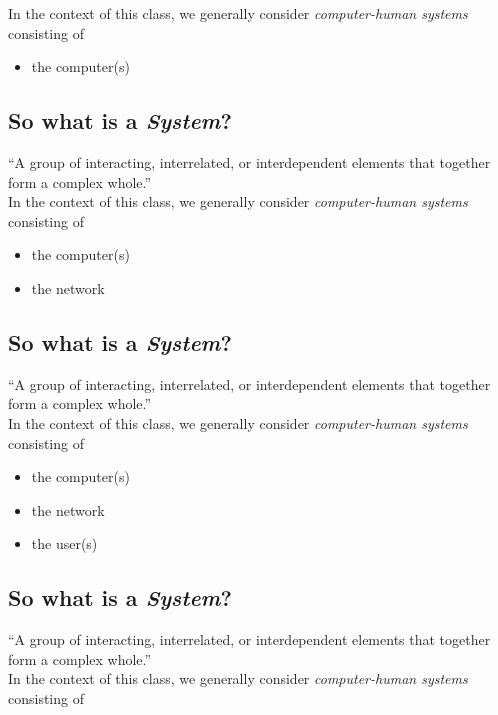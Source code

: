 \documentclass[xga]{xdvislides}
\begin{document}
In the context of this class, we generally consider {\em computer-human
systems} consisting of

\begin{itemize}
	\item the computer(s)
\end{itemize}

\subsection{So what is a {\em System}?}
``A group of interacting, interrelated, or interdependent elements that
together form a complex whole.''
\\

In the context of this class, we generally consider {\em computer-human
systems} consisting of

\begin{itemize}
	\item the computer(s)
	\item the network
\end{itemize}

\subsection{So what is a {\em System}?}
``A group of interacting, interrelated, or interdependent elements that
together form a complex whole.''
\\

In the context of this class, we generally consider {\em computer-human
systems} consisting of

\begin{itemize}
	\item the computer(s)
	\item the network
\end{itemize}
\vspace{.2in}

\begin{itemize}
	\item the user(s)
\end{itemize}

\subsection{So what is a {\em System}?}
``A group of interacting, interrelated, or interdependent elements that
together form a complex whole.''
\\

In the context of this class, we generally consider {\em computer-human
systems} consisting of
\end{document}
